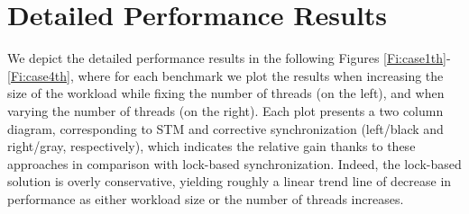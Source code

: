 \section{Detailed Performance Results}
\label{Se:perf}

%
We depict the detailed performance results in the following Figures \ref{Fi:case1th}-\ref{Fi:case4th}, where for each benchmark we plot the results when increasing the size of the workload while fixing the number of threads (on the left), and when varying the number of threads (on the right).
Each plot presents a two column diagram, corresponding to STM and corrective synchronization (left/black and right/gray, respectively), which indicates the relative gain thanks to these approaches in comparison with lock-based synchronization. Indeed, the lock-based solution is overly conservative, yielding roughly a linear trend line of decrease in performance as either workload size or the number of threads increases.

